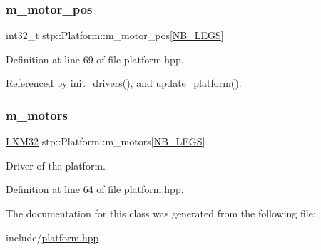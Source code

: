 \subsubsection{\texorpdfstring{m\+\_\+motor\+\_\+pos}{m\_motor\_pos}}
{\footnotesize\ttfamily int32\+\_\+t stp\+::\+Platform\+::m\+\_\+motor\+\_\+pos\mbox{[}\hyperlink{model_8hpp_ae44092ed043cb4350e2df47fdee890b9}{N\+B\+\_\+\+L\+E\+GS}\mbox{]}\hspace{0.3cm}{\ttfamily [private]}}



Definition at line 69 of file platform.\+hpp.



Referenced by init\+\_\+drivers(), and update\+\_\+platform().

\mbox{\label{classstp_1_1_platform_a4cba8b9fff700a4f860ee8ef51e50124}} 
\subsubsection{\texorpdfstring{m\+\_\+motors}{m\_motors}}
{\footnotesize\ttfamily \hyperlink{class_l_x_m32}{L\+X\+M32} stp\+::\+Platform\+::m\+\_\+motors\mbox{[}\hyperlink{model_8hpp_ae44092ed043cb4350e2df47fdee890b9}{N\+B\+\_\+\+L\+E\+GS}\mbox{]}\hspace{0.3cm}{\ttfamily [private]}}

Driver of the platform. 

Definition at line 64 of file platform.\+hpp.



The documentation for this class was generated from the following file\+:\begin{DoxyCompactItemize}
\item 
include/\hyperlink{platform_8hpp}{platform.\+hpp}\end{DoxyCompactItemize}
